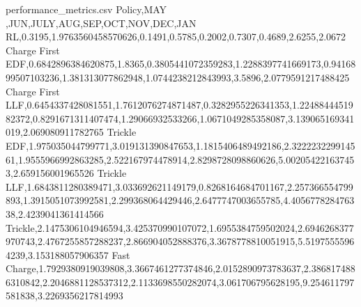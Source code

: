 
\begin{filecontents}{performance_metrics.csv}
Policy,MAY ,JUN,JULY,AUG,SEP,OCT,NOV,DEC,JAN
RL,0.3195,1.9763560458570626,0.1491,0.5785,0.2002,0.7307,0.4689,2.6255,2.0672 
Charge First EDF,0.6842896384620875,1.8365,0.3805441072359283,1.2288397741669173,0.9416899507103236,1.381313077862948,1.0744238212843993,3.5896,2.0779591217488425
Charge First LLF,0.6454337428081551,1.7612076274871487,0.3282955226341353,1.2248844451982372,0.8291671311407474,1.29066932533266,1.0671049285358087,3.139065169341019,2.069080911782765
Trickle EDF,1.975035044799771,3.019131390847653,1.1815406489492186,2.322223229914561,1.9555966992863285,2.522167974478914,2.8298728098860626,5.002054221637453,2.659156001965526
Trickle LLF,1.6843811280389471,3.033692621149179,0.8268164684701167,2.257366554799893,1.3915051073992581,2.299368064429446,2.6477747003655785,4.405677828476338,2.4239041361414566
Trickle,2.1475306104946594,3.425370990107072,1.6955384759502024,2.6946268377970743,2.4767255857288237,2.866904052888376,3.3678778810051915,5.51975555964239,3.153188057906357
Fast Charge,1.7929380919039808,3.3667461277374846,2.0152890973783637,2.3868174886310842,2.2046881128537312,2.1133698550282074,3.061706795628195,9.254611797581838,3.2269356217814993
\end{filecontents} 
